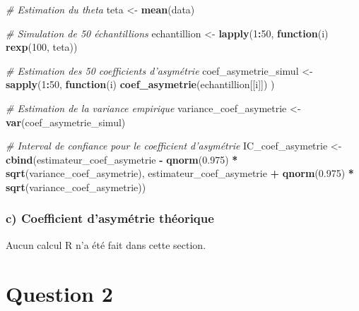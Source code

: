\documentclass[]{article}
\newenvironment{Shaded}{\begin{snugshade}}{\end{snugshade}}
\newcommand{\KeywordTok}[1]{\textcolor[rgb]{0.13,0.29,0.53}{\textbf{#1}}}
\newcommand{\DecValTok}[1]{\textcolor[rgb]{0.00,0.00,0.81}{#1}}
\newcommand{\FloatTok}[1]{\textcolor[rgb]{0.00,0.00,0.81}{#1}}
\newcommand{\StringTok}[1]{\textcolor[rgb]{0.31,0.60,0.02}{#1}}
\newcommand{\CommentTok}[1]{\textcolor[rgb]{0.56,0.35,0.01}{\textit{#1}}}
\newcommand{\ControlFlowTok}[1]{\textcolor[rgb]{0.13,0.29,0.53}{\textbf{#1}}}
\newcommand{\OperatorTok}[1]{\textcolor[rgb]{0.81,0.36,0.00}{\textbf{#1}}}
\newcommand{\NormalTok}[1]{#1}
\begin{document}
\begin{Shaded}
\begin{Highlighting}[]
\CommentTok{# Estimation du theta }
\NormalTok{teta <-}\StringTok{ }\KeywordTok{mean}\NormalTok{(data)}

\CommentTok{# Simulation de 50 échantillions}
\NormalTok{echantillion <-}\StringTok{ }\KeywordTok{lapply}\NormalTok{(}\DecValTok{1}\OperatorTok{:}\DecValTok{50}\NormalTok{, }\ControlFlowTok{function}\NormalTok{(i) }\KeywordTok{rexp}\NormalTok{(}\DecValTok{100}\NormalTok{, teta))}

\CommentTok{# Estimation des 50 coefficients d'asymétrie}
\NormalTok{coef_asymetrie_simul <-}\StringTok{ }\KeywordTok{sapply}\NormalTok{(}\DecValTok{1}\OperatorTok{:}\DecValTok{50}\NormalTok{, }\ControlFlowTok{function}\NormalTok{(i) }\KeywordTok{coef_asymetrie}\NormalTok{(echantillion[[i]]) )}

\CommentTok{# Estimation de la variance empirique}
\NormalTok{variance_coef_asymetrie <-}\StringTok{ }\KeywordTok{var}\NormalTok{(coef_asymetrie_simul)}

\CommentTok{# Interval de confiance pour le coefficient d'asymétrie}
\NormalTok{IC_coef_asymetrie <-}\StringTok{ }\KeywordTok{cbind}\NormalTok{(estimateur_coef_asymetrie }\OperatorTok{-}\StringTok{ }
\StringTok{                               }\KeywordTok{qnorm}\NormalTok{(}\FloatTok{0.975}\NormalTok{) }\OperatorTok{*}\StringTok{ }\KeywordTok{sqrt}\NormalTok{(variance_coef_asymetrie),}
\NormalTok{                           estimateur_coef_asymetrie }\OperatorTok{+}\StringTok{ }
\StringTok{                               }\KeywordTok{qnorm}\NormalTok{(}\FloatTok{0.975}\NormalTok{) }\OperatorTok{*}\StringTok{ }\KeywordTok{sqrt}\NormalTok{(variance_coef_asymetrie))}
\end{Highlighting}
\end{Shaded}

\subsubsection{c) Coefficient d'asymétrie
théorique}\label{c-coefficient-dasymetrie-theorique-1}

Aucun calcul R n'a été fait dans cette section.

\newpage

\section{Question 2}\label{question-2-1}
\end{document}
